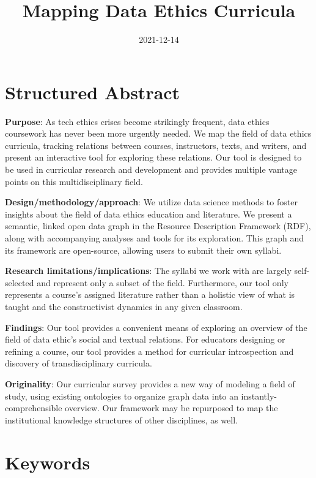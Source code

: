 \documentclass[
]{article}
\title{Mapping Data Ethics Curricula}
\author{}
\date{2021-12-14}
\begin{document}
\maketitle

\hypertarget{structured-abstract}{%
\section{Structured Abstract}\label{structured-abstract}}

\textbf{Purpose}: As tech ethics crises become strikingly frequent, data
ethics coursework has never been more urgently needed. We map the field
of data ethics curricula, tracking relations between courses,
instructors, texts, and writers, and present an interactive tool for
exploring these relations. Our tool is designed to be used in curricular
research and development and provides multiple vantage points on this
multidisciplinary field.

\textbf{Design/methodology/approach}: We utilize data science methods to
foster insights about the field of data ethics education and literature.
We present a semantic, linked open data graph in the Resource
Description Framework (RDF), along with accompanying analyses and tools
for its exploration. This graph and its framework are open-source,
allowing users to submit their own syllabi.

\textbf{Research limitations/implications}: The syllabi we work with are
largely self-selected and represent only a subset of the field.
Furthermore, our tool only represents a course's assigned literature
rather than a holistic view of what is taught and the constructivist
dynamics in any given classroom.

\textbf{Findings}: Our tool provides a convenient means of exploring an
overview of the field of data ethic's social and textual relations. For
educators designing or refining a course, our tool provides a method for
curricular introspection and discovery of transdisciplinary curricula.

\textbf{Originality}: Our curricular survey provides a new way of
modeling a field of study, using existing ontologies to organize graph
data into an instantly-comprehensible overview. Our framework may be
repurposed to map the institutional knowledge structures of other
disciplines, as well.

\hypertarget{keywords}{%
\section{Keywords}\label{keywords}}
\end{document}
